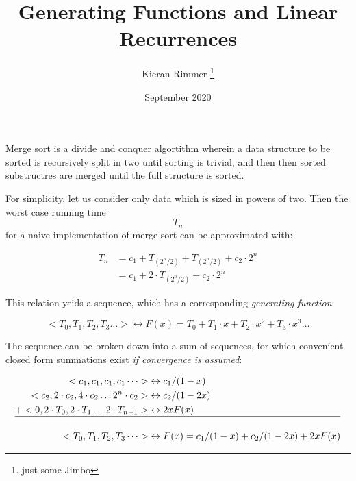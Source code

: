 \documentclass[12pt, letterpaper, twoside]{article}
\title{Generating Functions and Linear Recurrences}
\author{Kieran Rimmer \thanks{just some Jimbo}}
\date{September 2020}
\begin{document}
\maketitle

Merge sort is a divide and conquer algortithm wherein a data structure to be sorted is 
recursively split in two until sorting is trivial, and then then sorted substructres are
merged until the full structure is sorted.

For simplicity, let us consider only data which is sized in powers of two.
Then the worst case running time \[ T_n \] for a naive implementation of merge 
sort can be approximated with:

\begin{equation} 
\begin{split}
T_n & = c_1 + T_{(2^n/2)} + T_{(2^n/2)} + c_2 \cdot 2^n \\
    & = c_1 + 2 \cdot T_{(2^n/2)} + c_2 \cdot 2^n \label{eq1}
\end{split}
\end{equation}


This relation yeids a sequence, which has a corresponding \textit{generating function}:

\begin{equation} \label{eq2}
<T_0, T_1, T_2, T_3 \dots > \leftrightarrow F(x) = T_0 + T_1 \cdot x + T_2 \cdot x^2 + T_3 \cdot x^3 \dots
\end{equation}


The sequence can be broken down into a sum of sequences, for which convenient
closed form summations exist \textit{if convergence is assumed}:



\begin{equation} \label{eq3}
    \begin{split}
    <c_1, c_1, c_1, c_1 \dots > & \leftrightarrow c_1 / (1-x) \\
    <c_2, 2 \cdot c_2, 4 \cdot c_2 \dots 2^n \cdot c_2 > & \leftrightarrow c_2 / (1-2x) \\
    + <0, 2 \cdot T_0, 2 \cdot T_1 \dots 2 \cdot T_{n-1} > & \leftrightarrow 2xF(x) \\
    \hline \\
    <T_0, T_1, T_2, T_3 \dots > & \leftrightarrow F(x) = c_1 / (1-x) + c_2 / (1-2x) + 2xF(x) \\
\end{split}
\end{equation}
\end{document}
